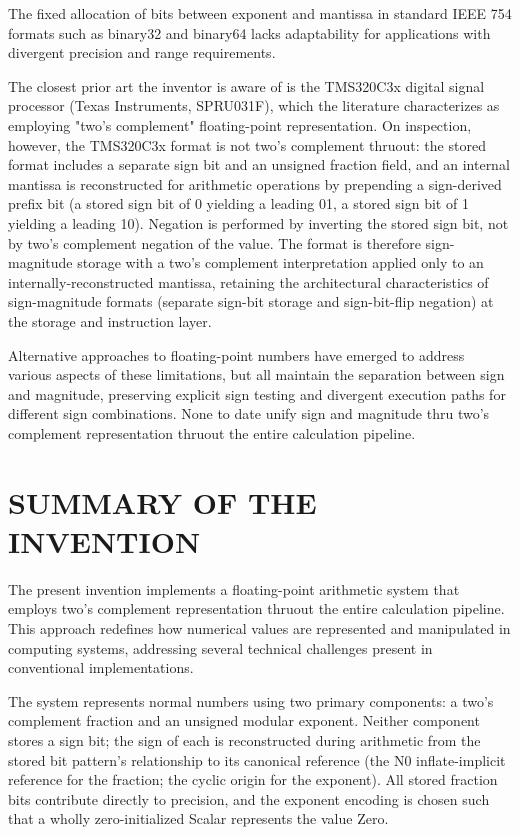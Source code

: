 \documentclass[12pt,letter]{article}
\begin{document}
The fixed allocation of bits between exponent and mantissa in standard IEEE 754 formats such as binary32 and binary64 lacks adaptability for applications with divergent precision and range requirements.

The closest prior art the inventor is aware of is the TMS320C3x digital signal processor (Texas Instruments, SPRU031F), which the literature characterizes as employing "two's complement" floating-point representation. On inspection, however, the TMS320C3x format is not two's complement thruout: the stored format includes a separate sign bit and an unsigned fraction field, and an internal mantissa is reconstructed for arithmetic operations by prepending a sign-derived prefix bit (a stored sign bit of 0 yielding a leading 01, a stored sign bit of 1 yielding a leading 10). Negation is performed by inverting the stored sign bit, not by two's complement negation of the value. The format is therefore sign-magnitude storage with a two's complement interpretation applied only to an internally-reconstructed mantissa, retaining the architectural characteristics of sign-magnitude formats (separate sign-bit storage and sign-bit-flip negation) at the storage and instruction layer.

Alternative approaches to floating-point numbers have emerged to address various aspects of these limitations, but all maintain the separation between sign and magnitude, preserving explicit sign testing and divergent execution paths for different sign combinations. None to date unify sign and magnitude thru two's complement representation thruout the entire calculation pipeline.

\newpage

\section{SUMMARY OF THE INVENTION}

The present invention implements a floating-point arithmetic system that employs two's complement representation thruout the entire calculation pipeline. This approach redefines how numerical values are represented and manipulated in computing systems, addressing several technical challenges present in conventional implementations.

The system represents normal numbers using two primary components: a two's complement fraction and an unsigned modular exponent. Neither component stores a sign bit; the sign of each is reconstructed during arithmetic from the stored bit pattern's relationship to its canonical reference (the N0 inflate-implicit reference for the fraction; the cyclic origin for the exponent). All stored fraction bits contribute directly to precision, and the exponent encoding is chosen such that a wholly zero-initialized Scalar represents the value Zero.
\end{document}
